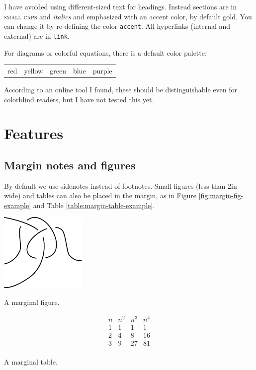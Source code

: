 \documentclass{sl2art}
\begin{document}
I have avoided using different-sized text for headings.
Instead sections are in {\scshape small caps} and {\itshape italics} and emphasized with an {\color{accent} accent} color, by default gold.
You can change it by re-defining the color {\color{accent} \texttt{accent}}.
All hyperlinks (internal and external) are in {\color{link} \texttt{link}}.%

For diagrams or colorful equations, there is a default color palette:
\begin{center}
  \begin{tabular}{ccccc}
    {\color{slred} red} 
    &
    {\color{slyellow} yellow}
    &
    {\color{slgreen} green}
    &
    {\color{slblue} blue} 
    &
    {\color{slpurple} purple} 
  \end{tabular}
\end{center}
According to an online tool I found, these should be distinguishable even for colorblind readers, but I have not tested this yet.

\section{Features}

\subsection{Margin notes and figures}
By default we use sidenotes instead of footnotes.
Small figures (less than 2in wide) and tables can also be placed in the margin, as in Figure \ref{fig:margin-fig-example} and Table \ref{table:margin-table-example}.
\begin{marginfigure}
  \centering
  \includegraphics{margin-fig-example.pdf}
  \caption{A marginal figure.}
  \label{fig:margin-fig-example}
\end{marginfigure}
\begin{margintable}
  \[
    \begin{array}{c|ccc}
      n & n^2 & n^3 & n^4\\
      \hline
      1 & 1 & 1 & 1\\
      2 & 4 & 8 & 16 \\
      3 & 9 & 27 & 81 \\
    \end{array}
  \]
  \caption{A marginal table.}
  \label{table:margin-table-example}
\end{margintable}
\end{document}
